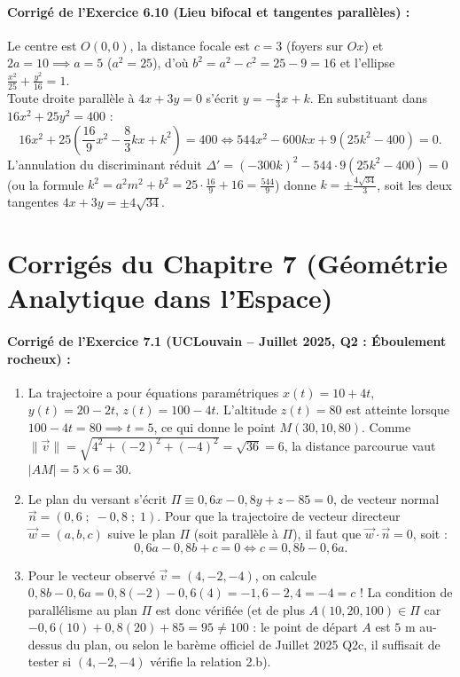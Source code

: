 \paragraph{Corrigé de l'Exercice 6.10 (Lieu bifocal et tangentes parallèles) :}
Le centre est $O(0,0)$, la distance focale est $c = 3$ (foyers sur $Ox$) et $2a = 10 \implies a = 5$ ($a^2 = 25$), d'où $b^2 = a^2 - c^2 = 25 - 9 = 16$ et l'ellipse $\boxed{\frac{x^2}{25} + \frac{y^2}{16} = 1}$.\\
Toute droite parallèle à $4x + 3y = 0$ s'écrit $y = -\frac{4}{3}x + k$. En substituant dans $16x^2 + 25y^2 = 400$ :
\[
    16x^2 + 25\left(\frac{16}{9}x^2 - \frac{8}{3}kx + k^2\right) = 400 \iff 544x^2 - 600kx + 9(25k^2 - 400) = 0.
\]
L'annulation du discriminant réduit $\Delta' = (-300k)^2 - 544 \cdot 9(25k^2 - 400) = 0$ (ou la formule $k^2 = a^2 m^2 + b^2 = 25\cdot\frac{16}{9} + 16 = \frac{544}{9}$) donne $k = \pm \frac{4\sqrt{34}}{3}$, soit les deux tangentes $\boxed{4x + 3y = \pm 4\sqrt{34}}$.

\section{Corrigés du Chapitre 7 (Géométrie Analytique dans l'Espace)}

\paragraph{Corrigé de l'Exercice 7.1 (UCLouvain -- Juillet 2025, Q2 : Éboulement rocheux) :}
\begin{enumerate}[label=(\alph*)]
    \item La trajectoire a pour équations paramétriques $x(t) = 10 + 4t$, $y(t) = 20 - 2t$, $z(t) = 100 - 4t$. L'altitude $z(t) = 80$ est atteinte lorsque $100 - 4t = 80 \implies t = 5$, ce qui donne le point $\boxed{M(30, 10, 80)}$. Comme $\|\vec{v}\| = \sqrt{4^2 + (-2)^2 + (-4)^2} = \sqrt{36} = 6$, la distance parcourue vaut $|AM| = 5 \times 6 = \boxed{30}$.
    \item Le plan du versant s'écrit $\Pi \equiv 0,6x - 0,8y + z - 85 = 0$, de vecteur normal $\vec{n} = (0,6\;;\; -0,8\;;\; 1)$. Pour que la trajectoire de vecteur directeur $\vec{w} = (a, b, c)$ suive le plan $\Pi$ (soit parallèle à $\Pi$), il faut que $\vec{w} \cdot \vec{n} = 0$, soit :
    \[
        0,6a - 0,8b + c = 0 \iff \boxed{c = 0,8b - 0,6a}.
    \]
    \item Pour le vecteur observé $\vec{v} = (4, -2, -4)$, on calcule $0,8b - 0,6a = 0,8(-2) - 0,6(4) = -1,6 - 2,4 = -4 = c$ ! La condition de parallélisme au plan $\Pi$ est donc vérifiée (et de plus $A(10,20,100) \in \Pi$ car $-0,6(10)+0,8(20)+85 = 95 \neq 100$ : le point de départ $A$ est $5\text{ m}$ au-dessus du plan, ou selon le barème officiel de Juillet 2025 Q2c, il suffisait de tester si $(4,-2,-4)$ vérifie la relation 2.b).
\end{enumerate}

